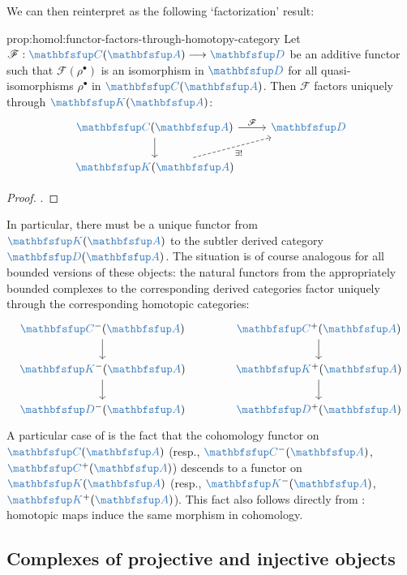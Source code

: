 We can then reinterpret  as the following
`factorization' result:

\begin{prop}{}{prop:homol:functor-factors-through-homotopy-category}
  Let $\mathscr{F} : \categ{C}(\categ{A}) \longrightarrow \categ{D}$
  be an additive functor such that $\mathscr{F}(\rho^\bullet)$ is an
  isomorphism in $\categ{D}$ for all quasi-isomorphisms $\rho^\bullet$
  in $\categ{C}(\categ{A})$.  Then $\mathscr{F}$ factors uniquely
  through $\categ{K}(\categ{A})$:
  \[\begin{tikzcd}
      \categ{C}(\categ{A}) \arrow[r, "\mathscr{F}"] \arrow[d]
      & \categ{D} \\
      \categ{K}(\categ{A}) \arrow[ur, dashed, "\exists!"']
    \end{tikzcd}\]
\end{prop}
\begin{proof}
  .
\end{proof}

In particular, there must be a unique functor from
$\categ{K}(\categ{A})$ to the subtler derived category
$\categ{D}(\categ{A})$. The situation is of course analogous for all
bounded versions of these objects: the natural functors from the
appropriately bounded complexes to the corresponding derived
categories factor uniquely through the corresponding homotopic
categories:
\[\begin{tikzcd}[column sep=large]
    \categ{C}^-(\categ{A}) \arrow[d] & \categ{C}^+(\categ{A})
    \arrow[d] \\
    \categ{K}^-(\categ{A}) \arrow[d] & \categ{K}^+(\categ{A})
    \arrow[d] \\
    \categ{D}^-(\categ{A}) & \categ{D}^+(\categ{A})
  \end{tikzcd}\] A particular case of 
is the fact that the cohomology functor on $\categ{C}(\categ{A})$
(resp., $\categ{C}^-(\categ{A})$, $\categ{C}^+(\categ{A})$) descends
to a functor on $\categ{K}(\categ{A})$ (resp.,
$\categ{K}^-(\categ{A})$, $\categ{K}^+(\categ{A})$). This fact also
follows directly from : homotopic maps induce the
same morphism in cohomology.

\subsection{Complexes of projective and injective objects}
\label{subsec:homol:complexes-of-projective-and-injective-objects}

